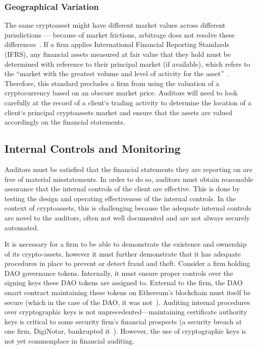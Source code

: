 \subsubsection{Geographical Variation}
The same cryptoasset might have different market values across different jurisdictions — because of market frictions, arbitrage does not resolve these differences~\cite{kroeger2017law}. If a firm applies International Financial Reporting Standards (IFRS), any financial assets measured at fair value that they hold must be determined with reference to their principal market (if available), which refers to the ``market with the greatest volume and level of activity for the asset''~\cite{ifrs13fairvalue}. Therefore, this standard precludes a firm from using the valuation of a cryptocurrency based on an obscure market price. Auditors will need to look carefully at the record of a client`s trading activity to determine the location of a client`s principal cryptoassets market and ensure that the assets are valued accordingly on the financial statements.



\subsection{Internal Controls and Monitoring} \label{sec:auditing:framework:internalcontrol}
Auditors must be satisfied that the financial statements they are reporting on are free of material misstatements. In order to do so, auditors must obtain reasonable assurance that the internal controls of the client are effective. This is done by testing the design and operating effectiveness of the internal controls. In the context of cryptoassets, this is challenging because the adequate internal controls are novel to the auditors, often not well documented and are not always securely automated.

It is necessary for a firm to be able to demonstrate the existence and ownership of its crypto-assets, however it must further demonstrate that it has adequate procedures in place to prevent or detect fraud and theft. Consider a firm holding DAO governance tokens. Internally, it must ensure proper controls over the signing keys these DAO tokens are assigned to. External to the firm, the DAO smart contract maintaining these tokens on Ethereum's blockchain must itself be secure (which in the case of the DAO, it was not~\cite{siegel2016daohack}). Auditing internal procedures over cryptographic keys is not unprecedented---maintaining certificate authority keys is critical to some security firm's financial prospects (a security breach at one firm, DigiNotar, bankrupted it~\cite{van2013diginotar}). However, the use of cryptographic keys is not yet commonplace in financial auditing.

